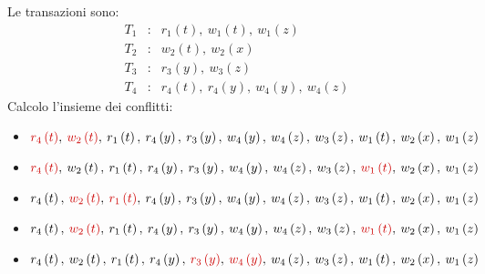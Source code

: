 \documentclass[a4paper]{article}
\begin{document}
	\noindent
	Le transazioni sono:
	\begin{equation*}
		\begin{array}{lll}
			T_{1} &:& r_{1}\left(t\right), \: w_{1}\left(t\right), \: w_{1}\left(z\right) \\
			T_{2} &:& w_{2}\left(t\right), \: w_{2}\left(x\right) \\
			T_{3} &:& r_{3}\left(y\right), \: w_{3}\left(z\right) \\
			T_{4} &:& r_{4}\left(t\right), \: r_{4}\left(y\right), \: w_{4}\left(y\right), \: w_{4}\left(z\right) 
		\end{array}
	\end{equation*}
	Calcolo l'insieme dei conflitti:
	\begin{itemize}
		\item $\textcolor{Red3}{r_{4}\left(t\right)}, \: \textcolor{Red3}{w_{2}\left(t\right)}, \: r_{1}\left(t\right), \: r_{4}\left(y\right), \: r_{3}\left(y\right), \: w_{4}\left(y\right), \: w_{4}\left(z\right), \: w_{3}\left(z\right), \: w_{1}\left(t\right), \: w_{2}\left(x\right), \: w_{1}\left(z\right)$
		
		\item $\textcolor{Red3}{r_{4}\left(t\right)}, \: w_{2}\left(t\right), \: r_{1}\left(t\right), \: r_{4}\left(y\right), \: r_{3}\left(y\right), \: w_{4}\left(y\right), \: w_{4}\left(z\right), \: w_{3}\left(z\right), \: \textcolor{Red3}{w_{1}\left(t\right)}, \: w_{2}\left(x\right), \: w_{1}\left(z\right)$
		
		\item $r_{4}\left(t\right), \: \textcolor{Red3}{w_{2}\left(t\right)}, \: \textcolor{Red3}{r_{1}\left(t\right)}, \: r_{4}\left(y\right), \: r_{3}\left(y\right), \: w_{4}\left(y\right), \: w_{4}\left(z\right), \: w_{3}\left(z\right), \: w_{1}\left(t\right), \: w_{2}\left(x\right), \: w_{1}\left(z\right)$
		
		\item $r_{4}\left(t\right), \: \textcolor{Red3}{w_{2}\left(t\right)}, \: r_{1}\left(t\right), \: r_{4}\left(y\right), \: r_{3}\left(y\right), \: w_{4}\left(y\right), \: w_{4}\left(z\right), \: w_{3}\left(z\right), \: \textcolor{Red3}{w_{1}\left(t\right)}, \: w_{2}\left(x\right), \: w_{1}\left(z\right)$
		
		\item $r_{4}\left(t\right), \: w_{2}\left(t\right), \: r_{1}\left(t\right), \: r_{4}\left(y\right), \: \textcolor{Red3}{r_{3}\left(y\right)}, \: \textcolor{Red3}{w_{4}\left(y\right)}, \: w_{4}\left(z\right), \: w_{3}\left(z\right), \: w_{1}\left(t\right), \: w_{2}\left(x\right), \: w_{1}\left(z\right)$
		

\end{itemize}
\end{document}

